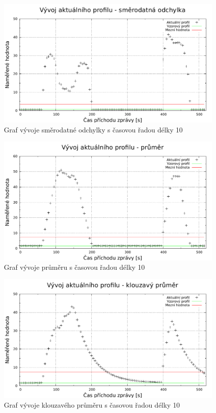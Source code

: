    \begin{figure}[ht]
   \begin{center}
   \includegraphics[scale=0.7]{pictures/standard_deviation_progress}
   \caption{Graf vývoje směrodatné odchylky s časovou řadou délky 10}
   \label{obr.progressStandardDeviation}
   \end{center}
   \end{figure}
    
  \begin{figure}[ht]
   \begin{center}
   \includegraphics[scale=0.7]{pictures/average_progress}
   \caption{Graf vývoje průměru s časovou řadou délky 10}
   \label{obr.progressAverage}
   \end{center}
   \end{figure}
   
   \begin{figure}[ht]
   \begin{center}
   \includegraphics[scale=0.7]{pictures/cum_average_progress}
   \caption{Graf vývoje klouzavého průměru s časovou řadou délky 10}
   \label{obr.progressCumAverage}
   \end{center}
   \end{figure}